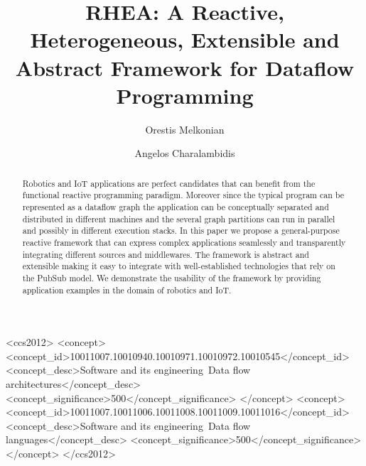 \documentclass[sigplan,screen,review,anonymous]{acmart}
\begin{document}


\title[RHEA]{RHEA: A Reactive, Heterogeneous, Extensible and Abstract Framework for Dataflow Programming}

\author{Orestis Melkonian}

\author{Angelos Charalambidis}

\begin{abstract}
Robotics and IoT applications are perfect candidates that can benefit from
the functional reactive programming paradigm. Moreover since the typical
program can be represented as a dataflow graph the application can be conceptually
separated and distributed in different machines and the several graph partitions
can run in parallel and possibly in different execution stacks. In this paper
we propose a general-purpose reactive framework that can express complex
applications seamlessly and transparently integrating different sources and
middlewares. The framework is abstract and extensible making it easy to integrate
with well-established technologies that rely on the PubSub model. We demonstrate
the usability of the framework by providing application examples in the domain of
robotics and IoT.
\end{abstract}

\begin{CCSXML} <ccs2012> <concept>
<concept_id>10011007.10010940.10010971.10010972.10010545</concept_id>
<concept_desc>Software and its engineering~Data flow
architectures</concept_desc> <concept_significance>500</concept_significance>
</concept> <concept>
<concept_id>10011007.10011006.10011008.10011009.10011016</concept_id>
<concept_desc>Software and its engineering~Data flow languages</concept_desc>
<concept_significance>500</concept_significance> </concept> </ccs2012>
\end{CCSXML}

\end{document}
